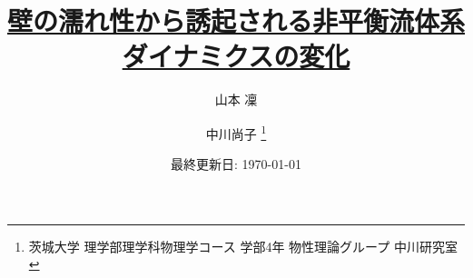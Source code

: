 \documentclass[dvipdfmx]{jsreport}
\begin{document}
\title{\href{https://github.com/m-agnet/Report.git}{壁の濡れ性から誘起される非平衡流体系ダイナミクスの変化}}
\author{山本 凜 \and 中川尚子 \thanks{茨城大学 理学部理学科物理学コース 学部4年 物性理論グループ 中川研究室}}
\date{最終更新日: \today}
\maketitle
\newpage

\setcounter{tocdepth}{3}
\tableofcontents
\newpage








\appendix






\end{document}
